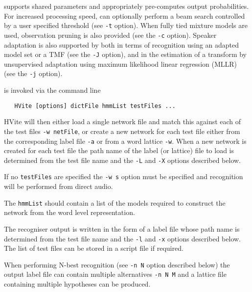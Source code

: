  supports shared parameters and appropriately pre-computes 
output probabilities. 
For increased processing speed,  can optionally perform a beam
search controlled by a user specified threshold (see \texttt{-t} option).
When fully tied mixture models are used, observation pruning is also provided
(see the  \texttt{-c} option).
Speaker adaptation is also supported by  both in terms of 
recognition using an adapted model set or a TMF (see the \texttt{-J} option),  
and in the estimation of a transform by unsupervised adaptation using maximum 
likelihood linear regression (MLLR) (see the \texttt{-j} option). 


 is invoked via the command line
\begin{verbatim}
   HVite [options] dictFile hmmList testFiles ...
\end{verbatim}
HVite will then either load a single network file and match this
against each of the test files \texttt{-w netFile}, or create a
new network for each test file either from the corresponding 
label file \texttt{-a} or from a word lattice \texttt{-w}.
When a new network is created for each test file the path name
of the label (or lattice) file to load is determined from the
test file name and the \texttt{-L} and \texttt{-X} options
described below.

If no \texttt{testFiles} are specified the \texttt{-w s} option must
be specified and recognition will be performed from direct audio.

The \texttt{hmmList} should contain a list of the models required to
construct the network from the word level representation.

The recogniser output is written in the form of a label file whose
path name is determined from the test file name and the \texttt{-l} and 
\texttt{-x} options described below. The list of test files can be stored 
in a script file if required.

When performing N-best recognition (see \texttt{-n N} option described
below) the output label file can contain multiple alternatives
\texttt{-n N M} and a lattice file containing multiple hypotheses can
be produced.

